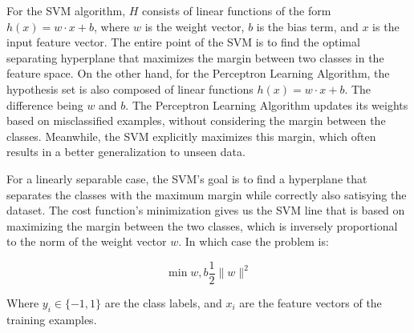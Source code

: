 \documentclass[12pt]{article}
\begin{document}
\begin{enumerate}


For the SVM algorithm, \(H\) consists of linear functions of the form \(h(x) = w \cdot x + b\), where \(w\) is the weight vector, \(b\) is the bias term, and \(x\) is the input feature vector. The entire point of the SVM is to find the optimal separating hyperplane that maximizes the margin between two classes in the feature space. On the other hand, for the Perceptron Learning Algorithm, the hypothesis set is also composed of linear functions \(h(x) = w \cdot x + b\). The difference being \(w\) and \(b\). The Perceptron Learning Algorithm updates its weights based on misclassified examples, without considering the margin between the classes. Meanwhile, the SVM explicitly maximizes this margin, which often results in a better generalization to unseen data.




For a linearly separable case, the SVM's goal is to find a hyperplane that separates the classes with the maximum margin while correctly also satisying the dataset. The cost function's minimization gives us the SVM line that is based on maximizing the margin between the two classes, which is inversely proportional to the norm of the weight vector \(w\). In which case the problem is:

\[
\min{w, b} \frac{1}{2} \|w\|^2
\]

Where \(y_i \in \{-1, 1\}\) are the class labels, and \(x_i\) are the feature vectors of the training examples. 




\end{enumerate}
\end{document}
